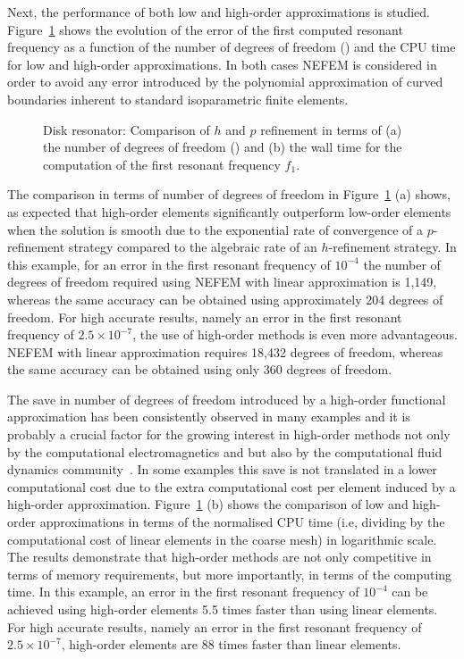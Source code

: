 Next, the performance of both low and high-order approximations is studied. Figure~\ref{fig:circleHvsP} shows the evolution of the error of the first computed resonant frequency as a function of the number of degrees of freedom (\ndof) and the CPU time for low and high-order approximations. In both cases NEFEM is considered in order to avoid any error introduced by the polynomial approximation of curved boundaries inherent to standard isoparametric finite elements.
\begin{figure}[!ht]
	\centering
	\caption{Disk resonator: Comparison of $h$ and $p$ refinement in terms of (a) the number of degrees of freedom (\ndof) and (b) the wall time for the computation of the first resonant frequency $f_1$.}
	\label{fig:circleHvsP}
\end{figure}
The comparison in terms of number of degrees of freedom in Figure~\ref{fig:circleHvsP} (a) shows, as expected that high-order elements significantly outperform low-order elements when the solution is smooth due to the exponential rate of convergence of a $p$-refinement strategy compared to the algebraic rate of an $h$-refinement strategy. In this example, for an error in the first resonant frequency of $10^{-4}$ the number of degrees of freedom required using NEFEM with linear approximation is 1,149, whereas the same accuracy can be obtained using approximately 204 degrees of freedom. For high accurate results, namely an error in the first resonant frequency of $2.5 \times 10^{-7}$, the use of high-order methods is even more advantageous. NEFEM with linear approximation requires 18,432 degrees of freedom, whereas the same accuracy can be obtained using only 360 degrees of freedom. 

The save in number of degrees of freedom introduced by a high-order functional approximation has been consistently observed in many examples and it is probably a crucial factor for the growing interest in high-order methods not only by the computational electromagnetics and but also by the computational fluid dynamics community~\cite{ADIGMA,HO-Fluids}. In some examples this save is not translated in a lower computational cost due to the extra computational cost per element induced by a high-order approximation. Figure~\ref{fig:circleHvsP} (b) shows the comparison of low and high-order approximations in terms of the normalised CPU time (i.e, dividing by the computational cost of linear elements in the coarse mesh) in logarithmic scale. The results demonstrate that high-order methods are not only competitive in terms of memory requirements, but more importantly, in terms of the computing time. In this example, an error in the first resonant frequency of $10^{-4}$ can be achieved using high-order elements 5.5 times faster than using linear elements. For high accurate results, namely an error in the first resonant frequency of $2.5 \times 10^{-7}$, high-order elements are 88 times faster than linear elements.

